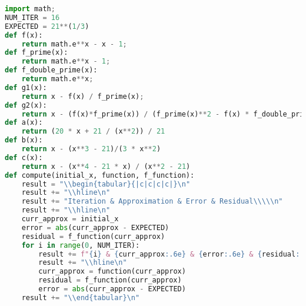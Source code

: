 \documentclass{article}
\begin{document}
\begin{enumerate}[label=\alph*.)]
\begin{lstlisting}[language=Python]
import math;
NUM_ITER = 16
EXPECTED = 21**(1/3)
def f(x):
    return math.e**x - x - 1;
def f_prime(x):
    return math.e**x - 1;
def f_double_prime(x):
    return math.e**x;
def g1(x):
    return x - f(x) / f_prime(x);
def g2(x):
    return x - (f(x)*f_prime(x)) / (f_prime(x)**2 - f(x) * f_double_prime(x))
def a(x):
    return (20 * x + 21 / (x**2)) / 21
def b(x):
    return x - (x**3 - 21)/(3 * x**2)
def c(x):
    return x - (x**4 - 21 * x) / (x**2 - 21)
def compute(initial_x, function, f_function):
    result = "\\begin{tabular}{|c|c|c|c|}\n"
    result += "\\hline\n"
    result += "Iteration & Approximation & Error & Residual\\\\\n"
    result += "\\hline\n"
    curr_approx = initial_x
    error = abs(curr_approx - EXPECTED)
    residual = f_function(curr_approx)
    for i in range(0, NUM_ITER):
        result += f"{i} & {curr_approx:.6e} & {error:.6e} & {residual:.6e}\\\\\n"
        result += "\\hline\n"
        curr_approx = function(curr_approx)
        residual = f_function(curr_approx)
        error = abs(curr_approx - EXPECTED)
    result += "\\end{tabular}\n"


\end{lstlisting}
\end{enumerate}
\end{document}
